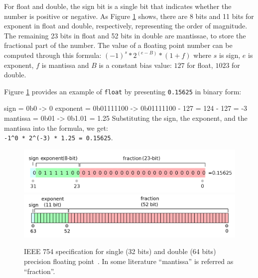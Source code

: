 \documentclass[logo,bsc,singlespacing,parskip]{infthesis}
\newcommand{\dtfloat}{\texttt{float}}
\newenvironment{VerbatimCompact}
  {\vspace*{-2.5mm}\VerbatimEnvironment
   \par\Verbatim}
  {\endVerbatim\vspace*{-2.4mm}}
\begin{document}
For float and double, the sign bit is a single bit that indicates whether the
number is positive or negative. As Figure \ref{fig:ieee-f32} shows, there are 8
bits and 11 bits for exponent in float and double, respectively, representing
the order of magnitude. The remaining 23 bits in float and 52 bits in double are
mantissae, to store the fractional part of the number. The value of a floating
point number can be computed through this formula: 
\begin{math} (-1)^s * 2^{(e - B)} * (1 + f)\end{math}
where \begin{math}s\end{math} is sign, \begin{math}e\end{math} is exponent, 
\begin{math}f\end{math} is mantissa and \begin{math}B\end{math} is a constant bias
value: \begin{math}127\end{math} for float, \begin{math}1023\end{math} for double. 

Figure \ref{fig:ieee-f32} provides an example of \dtfloat{} by presenting
\texttt{0.15625} in binary form:
\begin{VerbatimCompact}
sign     = 0b0        -> 0
exponent = 0b01111100 -> 0b01111100 - 127 = 124 - 127 = -3
mantissa = 0b01       -> 0b1.01 = 1.25
\end{VerbatimCompact}
Substituting the sign, the exponent, and the mantissa into the formula, we get: \\
\texttt{-1\^{}0 * 2\^{}(-3) * 1.25 = 0.15625}.



\begin{figure}
    \begin{center}
        \includegraphics[width=\linewidth]{image/ieee-f32.png}
        \includegraphics[width=\linewidth]{image/ieee-f64.png}
        \caption{IEEE 754 specification for single (32 bits) and double (64
        bits) precision floating point~\cite{ieee754-diagram}. In some
        literature ``mantissa'' is referred as ``fraction''.}
        \label{fig:ieee-f32}
    \end{center}
\end{figure}
\end{document}
